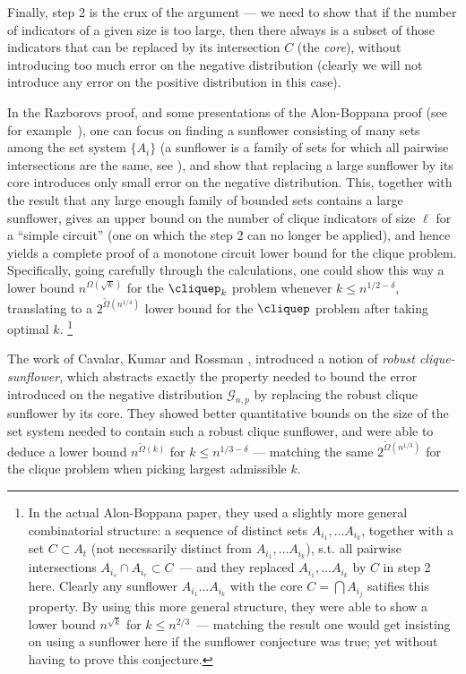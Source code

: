 Finally, step 2 is the crux of the argument --- we need to show that if the number of indicators of a given size is too large, then there always is a subset of those indicators that can be replaced by its intersection $C$ (the \emph{core}), without introducing too much error on the negative distribution (clearly we will not introduce any error on the positive distribution in this case). 

In the Razborovs proof, and some presentations of the Alon-Boppana proof (see for example~\cite[Chapter 9]{jukna2012boolean}), one can focus on finding a sunflower consisting of many sets among the set system $\{A_i\}$ (a sunflower is a family of sets for which all pairwise intersections are the same, see ), and show that replacing a large sunflower by its core introduces only small error on the negative distribution. This, together with the \ErdosRado result that any large enough family of bounded sets contains a large sunflower, gives an upper bound on the number of clique indicators of size $\ell$ for a ``simple circuit'' (one on which the step 2 can no longer be applied), and hence yields a complete proof of a monotone circuit lower bound for the clique problem. Specifically, going carefully through the calculations, one could show this way a lower bound $n^{\Omega(\sqrt{k})}$ for the $\cliquep_k$ problem whenever $k \leq n^{1/2 - \delta}$, translating to a $2^{\tilde{\Omega}(n^{1/4})}$ lower bound for the $\cliquep$ problem after taking optimal $k$.
\footnote{In the actual Alon-Boppana paper, they used a slightly more general combinatorial structure: a sequence of distinct sets $A_{i_1}, \ldots A_{i_k}$, together with a set $C \subset A_t$ (not necessarily distinct from $A_{i_1}, \ldots A_{i_k}$), s.t. all pairwise intersections $A_{i_s} \cap A_{i_r} \subset C$~--- and they replaced $A_{i_1}, \ldots A_{i_k}$ by $C$ in step 2 here. Clearly any sunflower $A_{i_1} \ldots A_{i_k}$ with the core $C = \bigcap A_{i_j}$ satifies this property. By using this more general structure, they were able to show a lower bound $n^{\sqrt{k}}$ for $k\leq n^{2/3}$~--- matching the result one would get insisting on using a sunflower here if the sunflower conjecture was true; yet without having to prove this conjecture. }

The work of Cavalar, Kumar and Rossman \cite{cavalar2022}, introduced a notion of \emph{robust clique-sunflower}, which abstracts exactly the property needed to bound the error introduced on the negative distribution $\mathcal{G}_{n,p}$  by replacing the robust clique sunflower by its core. They showed better quantitative bounds on the size of the set system needed to contain such a robust clique sunflower, and were able to deduce a lower bound $n^{\tilde{\Omega}(k)}$ for $k \leq n^{1/3 - \delta}$ --- matching the same $2^{\tilde\Omega(n^{1/3})}$ for the clique problem when picking largest admissible $k$.

